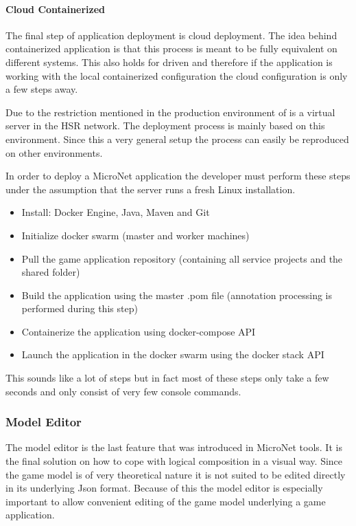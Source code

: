 \paragraph{Cloud Containerized}

The final step of \ms{} application deployment is cloud deployment. The idea
behind containerized application is that this process is meant to be fully
equivalent on different systems. This also holds for \ms{} driven \og{} and
therefore if the application is working with the local containerized
configuration the cloud configuration is only a few steps away.

Due to the restriction mentioned in  the production environment
of \mn{} is a virtual server in the HSR network. The deployment process is
mainly based on this environment. Since this a very general setup the process
can easily be reproduced on other environments.

In order to deploy a MicroNet \ms{} application the developer must perform these
steps under the assumption that the server runs a fresh Linux installation.

\begin{itemize}
  \item Install: Docker Engine, Java, Maven and Git
  \item Initialize docker swarm (master and worker machines)
  \item Pull the game application repository (containing all service projects
  and the shared folder)
  \item Build the application using the master .pom file (annotation processing
  is performed during this step)
  \item Containerize the application using docker-compose API
  \item Launch the application in the docker swarm using the docker stack API 
\end{itemize}

This sounds like a lot of steps but in fact most of these steps only take a few
seconds and only consist of very few console commands.

\subsubsection{Model Editor}

The model editor is the last feature that was introduced in MicroNet tools. It
is the final solution on how to cope with logical \ms{} composition in a visual
way. Since the game model is of very theoretical nature it is not suited to be
edited directly in its underlying Json format. Because of this the model editor
is especially important to allow convenient editing of the game model underlying
a game application.


